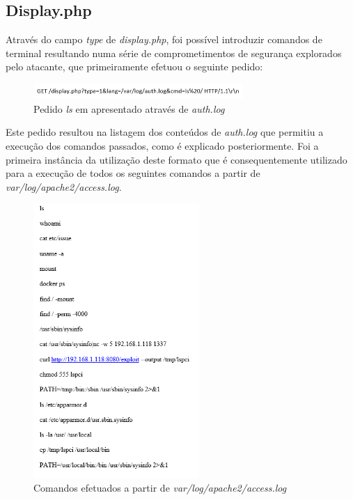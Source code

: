 \documentclass[10pt,english]{article}
\begin{document}
\subsection{Display.php}
\par Através do campo \textit{type} de \textit{display.php}, foi possível introduzir comandos de terminal resultando numa série de comprometimentos de segurança explorados pelo atacante, que primeiramente efetuou o seguinte pedido:
\begin{figure}[h]
    \centering
    \includegraphics[width=300]{images/GetAuthLog.png}
    \caption{Pedido \textit{ls} em apresentado através de \textit{auth.log}}
\end{figure}
\par Este pedido resultou na listagem dos conteúdos de \textit{auth.log} que permitiu a execução dos comandos passados, como é explicado posteriormente. Foi a primeira instância da utilização deste formato que é consequentemente utilizado para a execução de todos os seguintes comandos a partir de \textit{var/log/apache2/access.log}.
\begin{figure}[h]
    \centering
    \includegraphics[width=238]{images/ComandosApache2Log.png}
    \caption{Comandos efetuados a partir de \textit{var/log/apache2/access.log}}
\end{figure}
\end{document}
